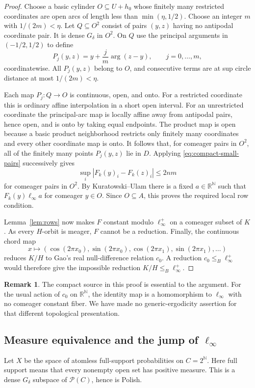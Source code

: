 \documentclass[11pt]{article}
\numberwithin{equation}{section}
\theoremstyle{definition}
\newtheorem{remark}[theorem]{Remark}
\newcommand{\N}{\mathbb N}
\newcommand{\Prob}{\mathcal P}
\begin{document}
\begin{proof}
Choose a basic cylinder $O\subseteq U+h_0$ whose finitely many restricted
coordinates are open arcs of length less than $\min(\eta,1/2)$.
Choose an integer $m$ with $1/(2m)<\eta$. Let $Q\subseteq O^2$ consist
of pairs $(y,z)$ having no antipodal coordinate pair. It is dense
$G_\delta$ in $O^2$. On $Q$ use the principal arguments in
$(-1/2,1/2)$ to define
\[
 P_j(y,z)=y+\frac jm\operatorname{arg}(z-y),
 \qquad j=0,\ldots,m,
\]
coordinatewise. All $P_j(y,z)$ belong to $O$, and consecutive terms are
at sup circle distance at most $1/(2m)<\eta$.

Each map $P_j:Q\to O$ is continuous, open, and onto. For a restricted
coordinate this is ordinary affine interpolation in a short open
interval. For an unrestricted coordinate the principal-arc map is
locally affine away from antipodal pairs, hence open, and is onto by
taking equal endpoints. The product map is open because a basic product
neighborhood restricts only finitely many coordinates and every other
coordinate map is onto. It follows that, for comeager pairs in $O^2$,
all of the finitely many points $P_j(y,z)$ lie in $D$.
Applying \eqref{eq:compact-small-pairs} successively gives
\[
 \sup_i|F_k(y)_i-F_k(z)_i|\le2nm
\]
for comeager pairs in $O^2$. By Kuratowski--Ulam there is a fixed
$a\in\mathbb R^{\mathbb N}$ such that
$F_k(y)\mathrel{\ell_\infty}a$ for comeager $y\in O$.
Since $O\subseteq A$, this proves the required local row condition.

Lemma~\ref{lem:rows} now makes $F$ constant modulo $\ell_\infty^+$ on a
comeager subset of $K$. As every $H$-orbit is meager, $F$ cannot be a
reduction. Finally, the continuous chord map
\[
 x\longmapsto
 (\cos(2\pi x_0),\sin(2\pi x_0),
  \cos(2\pi x_1),\sin(2\pi x_1),\ldots)
\]
reduces $K/H$ to Gao's real null-difference relation $c_0$.
A reduction $c_0\le_B\ell_\infty^+$ would therefore give the impossible
reduction $K/H\le_B\ell_\infty^+$.
\end{proof}

\begin{remark}
The compact source in this proof is essential to the argument. For the
usual action of $c_0$ on $\mathbb R^{\mathbb N}$, the identity map is a
homomorphism to $\ell_\infty$ with no comeager constant fiber. We have
made no generic-ergodicity assertion for that different topological
presentation.
\end{remark}
\subsection{Measure equivalence and the jump of \texorpdfstring{$\ell_\infty$}{ell infinity}}
\label{sec:measure-jump}
Let $X$ be the space of atomless full-support probabilities on $C=2^\N$.
Here full support means that every nonempty open set has positive measure.
This is a dense $G_\delta$ subspace of $\Prob(C)$, hence is Polish.
\end{document}
